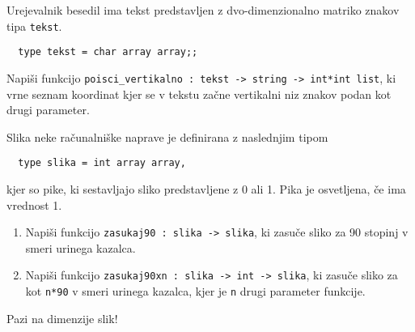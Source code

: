 \begin{ex}
  Urejevalnik besedil ima tekst predstavljen z dvo-dimenzionalno
  matriko znakov tipa \lstinline{tekst}.

\begin{lstlisting}
  type tekst = char array array;;
\end{lstlisting}

  Napi\v si funkcijo 
  \lstinline{poisci_vertikalno : tekst -> string -> int*int list}, 
  ki vrne seznam koordinat kjer se v tekstu za\v cne
  vertikalni niz znakov podan kot drugi parameter.
\end{ex} 



\begin{ex}
  Slika neke ra\v cunalni\v ske naprave je definirana z naslednjim
  tipom

\begin{lstlisting}
  type slika = int array array,
\end{lstlisting}
  kjer so pike, ki sestavljajo sliko predstavljene z 0 ali 1. Pika je
  osvetljena, \v ce ima vrednost 1.

  \begin{enumerate}[label=(\roman*)]
  \item Napi\v si funkcijo \lstinline{zasukaj90 : slika -> slika}, ki
    zasu\v ce sliko za 90 stopinj v smeri urinega kazalca.

  \item Napi\v si funkcijo 
  \lstinline{zasukaj90xn : slika -> int -> slika}, 
  ki zasu\v ce sliko za kot \lstinline{n*90} v smeri urinega
    kazalca, kjer je \lstinline{n} drugi parameter funkcije.
  \end{enumerate}

  Pazi na dimenzije slik!
\end{ex} 




